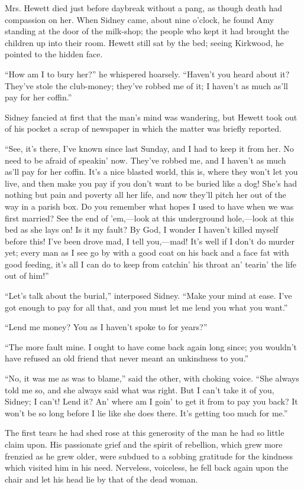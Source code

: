 Mrs. Hewett died just before daybreak
{\protect\hypertarget{171}{}{}}without a pang, as though death had
compassion on her. When Sidney came, about nine o'clock, he found Amy
standing at the door of the milk-shop; the people who kept it had
brought the children up into their room. Hewett still sat by the bed;
seeing Kirkwood, he pointed to the hidden face.

``How am I to bury her?'' he whispered hoarsely. ``Haven't you heard
about it? They've stole the club-money; they've robbed me of it; I
haven't as much as'll pay for her coffin.''

Sidney fancied at first that the man's mind was wandering, but Hewett
took out of his pocket a scrap of newspaper in which the matter was
briefly reported.

``See, it's there, I've known since last Sunday, and I had to keep it
from her. No need to be afraid of speakin' now. They've robbed me, and I
haven't as much as'll pay for her coffin. It's a nice blasted world,
this is, where they won't let you live, and then make you pay if you
don't want to be buried like a dog! She's had nothing but pain and
{\protect\hypertarget{172}{}{}}poverty all her life, and now they'll
pitch her out of the way in a parish box. Do you remember what hopes I
used to have when we was first married? See the end of 'em,---look at
this underground hole,---look at this bed as she lays on! Is it my
fault? By God, I wonder I haven't killed myself before this! I've been
drove mad, I tell you,---mad! It's well if I don't do murder yet; every
man as I see go by with a good coat on his back and a face fat with good
feeding, it's all I can do to keep from catchin' his throat an' tearin'
the life out of him!''

``Let's talk about the burial,'' interposed Sidney. ``Make your mind at
ease. I've got enough to pay for all that, and you must let me lend you
what you want.''

``Lend me money? You as I haven't spoke to for years?''

``The more fault mine. I ought to have come back again long since; you
wouldn't have refused an old friend that never meant an unkindness to
you.''

``No, it was me as was to blame,'' said the
{\protect\hypertarget{173}{}{}}other, with choking voice. ``She always
told me so, and she always said what was right. But I can't take it of
you, Sidney; I can't! Lend it? An' where am I goin' to get it from to
pay you back? It won't be so long before I lie like she does there. It's
getting too much for me.''

The first tears he had shed rose at this generosity of the man he had so
little claim upon. His passionate grief and the spirit of rebellion,
which grew more frenzied as he grew older, were subdued to a sobbing
gratitude for the kindness which visited him in his need. Nerveless,
voiceless, he fell back again upon the chair and let his head lie by
that of the dead woman.
